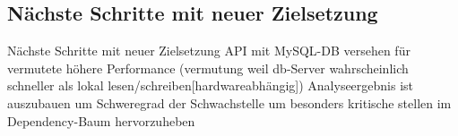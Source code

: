 \subsection{Nächste Schritte mit neuer Zielsetzung} \label{subsec:Nächste_Schritte}
    Nächste Schritte mit neuer Zielsetzung
    \ac{API} mit MySQL-DB versehen für vermutete höhere Performance (vermutung weil db-Server wahrscheinlich schneller als lokal lesen/schreiben[hardwareabhängig])
    Analyseergebnis ist auszubauen um Schweregrad der Schwachstelle um besonders kritische stellen im Dependency-Baum hervorzuheben